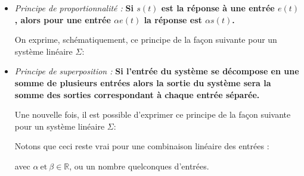 \begin{itemize}
    \item \emph{Principe de proportionnalité :}
        \textbf{Si $s(t)$ est la réponse à une entrée $e(t)$, alors 
        pour une entrée $\alpha e(t)$ la réponse est $\alpha s(t)$.}
        
        On exprime, schématiquement, ce principe de la façon suivante pour 
        un système linéaire $\Sigma$:
        \begin{center}
            
        \end{center}
    \item \emph{Principe de superposition :}
        \textbf{Si l'entrée du système se décompose en une somme 
        de plusieurs entrées alors la sortie du système sera la somme des 
        sorties correspondant à chaque entrée séparée.}

        Une nouvelle fois, il est possible d'exprimer ce principe de la façon 
        suivante pour un système linéaire $\Sigma$:
        \begin{center}
            
        \end{center}
        Notons que ceci reste vrai pour une combinaison linéaire des entrées :
        \begin{center}
            
        \end{center}
        avec $\alpha\ \text{et}\ \beta\in\mathbb{R}$, ou un nombre quelconques 
        d'entrées.
\end{itemize}
